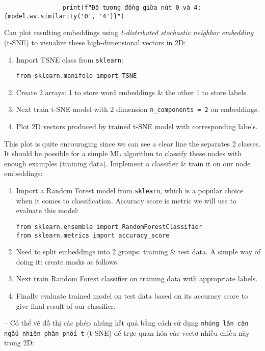 \documentclass{article}
\begin{document}
\begin{itemize}
\begin{itemize}
\begin{enumerate}
\begin{verbatim}
                print(f"Độ tương đồng giữa nút 0 và 4: {model.wv.similarity('0', '4')}")
            \end{verbatim}
        \end{enumerate}
        Can plot resulting embeddings using {\it t-distributed stochastic neighbor embedding} (t-SNE) to visualize these high-dimensional vectors in 2D:
        \begin{enumerate}
            \item Import TSNE class from {\tt sklearn}:
            \begin{verbatim}
from sklearn.manifold import TSNE
            \end{verbatim}
            \item Create 2 arrays: 1 to store word embeddings \& the other 1 to store labels.
            \item Next train t-SNE model with 2 dimension \verb|n_components = 2| on embeddings.
            \item Plot 2D vectors produced by trained t-SNE model with corresponding labels.
        \end{enumerate}
        This plot is quite encouraging since we can see a clear line the separates 2 classes. It should be possible for a simple ML algorithm to classify these nodes with enough examples (training data). Implement a classifier \& train it on our node embeddings:
        \begin{enumerate}
            \item Import a Random Forest model from {\tt sklearn}, which is a popular choice when it comes to classification. Accuracy score is metric we will use to evaluate this model:
            \begin{verbatim}
from sklearn.ensemble import RandomForestClassifier
from sklearn.metrics import accuracy_score
            \end{verbatim}
            \item Need to split embeddings into 2 groups: training \& test data. A simple way of doing it: create masks as follows.
            \item Next train Random Forest classifier on training data with appropriate labels.
            \item Finally evaluate trained model on test data based on its accuracy score to give final result of our classifier.
        \end{enumerate}
        -- Có thể vẽ đồ thị các phép nhúng kết quả bằng cách sử dụng {\tt nhúng lân cận ngẫu nhiên phân phối t} (t-SNE) để trực quan hóa các vectơ nhiều chiều này trong 2D:

\end{itemize}
\end{itemize}
\end{document}
